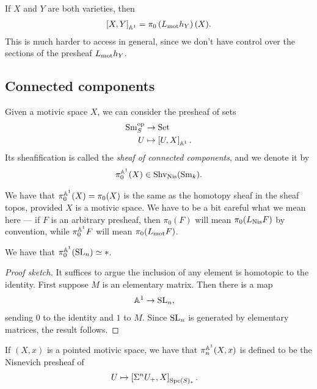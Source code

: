 \documentclass[11pt,openany]{book}
\begin{document}
\begin{example}\label{exa:genuine-classes-of-maps-between-schemes}
If $X$ and $Y$ are both varieties, then
\begin{align*}
    \left[ X,Y \right]_{\mathbb{A}^1} = \pi_0 \left( L_{\mathrm{mot}} h_Y \right)(X).
\end{align*}
This is much harder to access in general, since we don't have control over the sections of the presheaf $L_{\mathrm{mot}} h_Y$.
\end{example}

\subsection{Connected components}

Given a motivic space $X$, we can consider the presheaf of sets
\begin{align*}
    \mathrm{Sm}_S^{\mathrm{op}} &\to \mathrm{Set} \\
    U &\mapsto \left[ U,X \right]_{\mathbb{A}^1}.
\end{align*}
%
Its sheafification is called the \textit{sheaf of connected components}, and we denote it by
\begin{align*}
    \pi_0^{\mathbb{A}^1}(X) \in \mathrm{Shv}_{\mathrm{Nis}}(\mathrm{Sm}_k).
\end{align*}
%
\begin{note} We have that $\pi_0^{\mathbb{A}^1}(X) = \pi_0(X)$ is the same as the homotopy sheaf in the sheaf topos, provided $X$ is a motivic space. We have to be a bit careful what we mean here --- if $F$ is an arbitrary presheaf, then $\pi_0(F)$ will mean $\pi_0 (L_{\mathrm{Nis}} F)$ by convention, while $\pi_0^{\mathbb{A}^1}F$ will mean $\pi_0 (L_{\mathrm{mot}} F)$.
\end{note}

\begin{proposition} We have that $\pi_0^{\mathbb{A}^1}(\mathrm{SL}_n) \simeq \ast$.
\end{proposition}
\begin{proof}[Proof sketch] It suffices to argue the inclusion of any element is homotopic to the identity. First suppose $M$ is an elementary matrix. Then there is a map
\begin{align*}
    \mathbb{A}^1 &\to \mathrm{SL}_n,
\end{align*}
sending $0$ to the identity and $1$ to $M$. Since $\mathrm{SL}_n$ is generated by elementary matrices, the result follows.
\end{proof}




\begin{definition} If $(X,x)$ is a pointed motivic space, we have that $\pi_n^{\mathbb{A}^1}(X,x)$ is defined to be the Nisnevich presheaf of
\begin{align*}
    U &\mapsto \left[ \Sigma^n U_+, X \right]_{\mathrm{Spc}(S)_\ast}.
\end{align*}
\end{definition}
\end{document}
